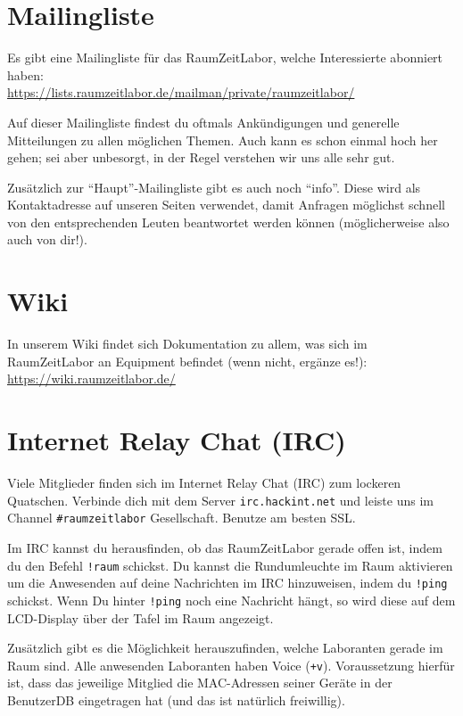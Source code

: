 \documentclass[12pt, DIV16, a4paper]{scrartcl}
\begin{document}
\section*{Mailingliste}

Es gibt eine Mailingliste für das RaumZeitLabor, welche Interessierte abonniert
haben:\\
\url{https://lists.raumzeitlabor.de/mailman/private/raumzeitlabor/}
\np

Auf dieser Mailingliste findest du oftmals Ankündigungen und generelle
Mitteilungen zu allen möglichen Themen. Auch kann es schon einmal hoch her
gehen; sei aber unbesorgt, in der Regel verstehen wir uns alle sehr gut.
\np

Zusätzlich zur ``Haupt''-Mailingliste gibt es auch noch ``info''. Diese wird als
Kontaktadresse auf unseren Seiten verwendet, damit Anfragen möglichst schnell
von den entsprechenden Leuten beantwortet werden können (möglicherweise also
auch von dir!).

\section*{Wiki}

In unserem Wiki findet sich Dokumentation zu allem, was sich im RaumZeitLabor
an Equipment befindet (wenn nicht, ergänze es!):
\url{https://wiki.raumzeitlabor.de/}

\section*{Internet Relay Chat (IRC)}

Viele Mitglieder finden sich im Internet Relay Chat (IRC) zum lockeren
Quatschen. Verbinde dich mit dem Server \texttt{irc.hackint.net} und leiste uns
im Channel \texttt{\#raumzeitlabor} Gesellschaft. Benutze am besten SSL.
\np

Im IRC kannst du herausfinden, ob das RaumZeitLabor gerade offen ist, indem du
den Befehl \texttt{!raum} schickst. Du kannst die Rundumleuchte im Raum
aktivieren um die Anwesenden auf deine Nachrichten im IRC hinzuweisen, indem du
\texttt{!ping} schickst. Wenn Du hinter \texttt{!ping} noch eine Nachricht
hängt, so wird diese auf dem LCD-Display über der Tafel im Raum angezeigt.
\np

Zusätzlich gibt es die Möglichkeit herauszufinden, welche Laboranten gerade im
Raum sind. Alle anwesenden Laboranten haben Voice (\texttt{+v}). Voraussetzung
hierfür ist, dass das jeweilige Mitglied die MAC-Adressen seiner Geräte in der
BenutzerDB eingetragen hat (und das ist natürlich freiwillig).
\end{document}
